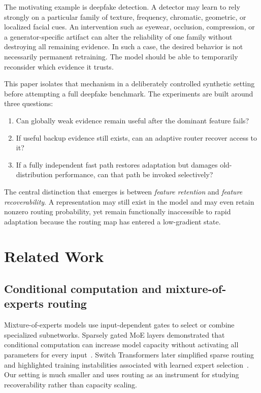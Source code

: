 \documentclass[10pt]{article}
\begin{document}
The motivating example is deepfake detection. A detector may learn to rely strongly on a particular family of texture, frequency, chromatic, geometric, or localized facial cues. An intervention such as eyewear, occlusion, compression, or a generator-specific artifact can alter the reliability of one family without destroying all remaining evidence. In such a case, the desired behavior is not necessarily permanent retraining. The model should be able to temporarily reconsider which evidence it trusts.

This paper isolates that mechanism in a deliberately controlled synthetic setting before attempting a full deepfake benchmark. The experiments are built around three questions:
\begin{enumerate}[leftmargin=*]
    \item Can globally weak evidence remain useful after the dominant feature fails?
    \item If useful backup evidence still exists, can an adaptive router recover access to it?
    \item If a fully independent fast path restores adaptation but damages old-distribution performance, can that path be invoked selectively?
\end{enumerate}

The central distinction that emerges is between \emph{feature retention} and \emph{feature recoverability}. A representation may still exist in the model and may even retain nonzero routing probability, yet remain functionally inaccessible to rapid adaptation because the routing map has entered a low-gradient state.

\section{Related Work}

\subsection{Conditional computation and mixture-of-experts routing}

Mixture-of-experts models use input-dependent gates to select or combine specialized subnetworks. Sparsely gated MoE layers demonstrated that conditional computation can increase model capacity without activating all parameters for every input~\cite{shazeer2017}. Switch Transformers later simplified sparse routing and highlighted training instabilities associated with learned expert selection~\cite{fedus2022}. Our setting is much smaller and uses routing as an instrument for studying recoverability rather than capacity scaling.
\end{document}
